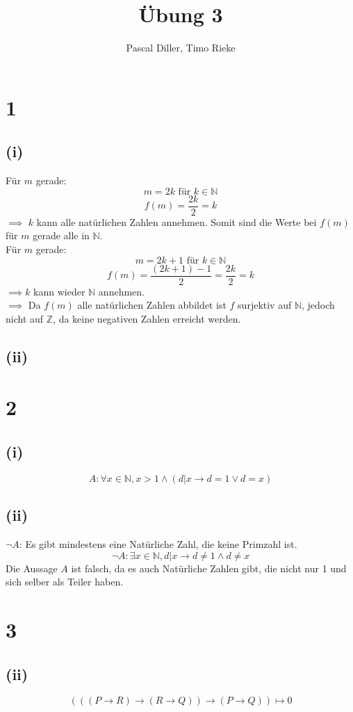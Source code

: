 \documentclass{article}
\title{Übung 3}
\author{Pascal Diller, Timo Rieke}
\begin{document}
\maketitle

\section{1}
\subsection{(i)}
Für $m$ gerade: \\
\[m = 2k \text{ für } k \in \mathbb{N}\]
\[f(m) = \frac{2k}{2} = k\]
$\implies$ $k$ kann alle natürlichen Zahlen annehmen. Somit sind die Werte bei $f(m)$ für $m$ gerade alle in $\mathbb{N}$. \\
\newline
Für $m$ gerade: \\
\[m = 2k + 1 \text{ für } k \in \mathbb{N}\]
\[f(m) = \frac{(2k + 1) - 1}{2} = \frac{2k}{2} = k\]
$\implies k$ kann wieder $\mathbb{N}$ annehmen. \\
\newline
$\implies$ Da $f(m)$ alle natürlichen Zahlen abbildet ist $f$ surjektiv auf $\mathbb{N}$, jedoch nicht auf $\mathbb{Z}$, da keine negativen Zahlen erreicht werden.
\subsection{(ii)}


\section{2}
\subsection{(i)}
\[A: \forall x \in \mathbb{N}, x > 1 \land (d|x \to d = 1 \lor d = x)\]
\subsection{(ii)}
$\neg A$: Es gibt mindestens eine Natürliche Zahl, die keine Primzahl ist.
\[\neg A: \exists x \in \mathbb{N}, d|x \to d \neq 1 \land d \neq x\]
Die Aussage $A$ ist falsch, da es auch Natürliche Zahlen gibt, die nicht nur 1 und sich selber als Teiler haben.

\section{3}
\subsection{(ii)}
\[\left( ((P \to R) \to (R \to Q)) \to (P \to Q) \right) \mapsto 0\]
\end{document}

